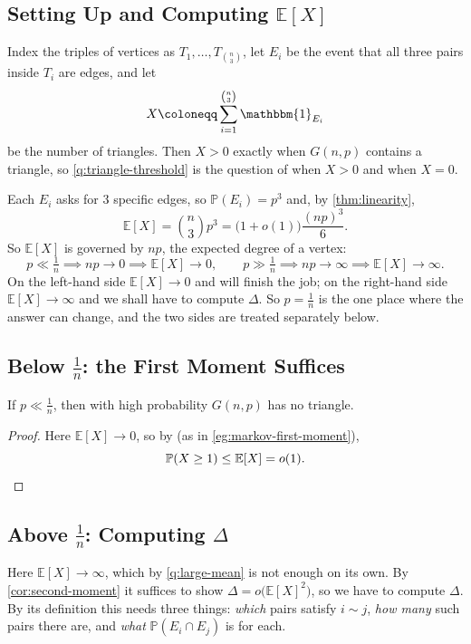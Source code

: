 \subsection{Setting Up and Computing \(\mathbb{E}[X]\)}

Index the triples of vertices as \(T_1, \ldots, T_{\binom{n}{3}}\), let \(E_i\) be the event that all three pairs inside \(T_i\) are edges, and let
\[
    X \coloneqq \sum_{i=1}^{\binom{n}{3}} \mathbbm{1}_{E_i}
\]
be the number of triangles. Then \(X > 0\) exactly when \(G(n,p)\) contains a triangle, so \autoref{q:triangle-threshold} is the question of when \(X > 0\) and when \(X = 0\).

Each \(E_i\) asks for \(3\) specific edges, so \(\mathbb{P}(E_i) = p^{3}\) and, by \autoref{thm:linearity},
\[
    \mathbb{E}[X] = \binom{n}{3} p^{3} = \bigl( 1 + o(1) \bigr) \frac{(np)^{3}}{6}.
\]
So \(\mathbb{E}[X]\) is governed by \(np\), the expected degree of a vertex:
\[
    p \ll \tfrac{1}{n} \implies np \to 0 \implies \mathbb{E}[X] \to 0,
    \qquad
    p \gg \tfrac{1}{n} \implies np \to \infty \implies \mathbb{E}[X] \to \infty.
\]
On the left-hand side \(\mathbb{E}[X] \to 0\) and  will finish the job; on the right-hand side \(\mathbb{E}[X] \to \infty\) and we shall have to compute \(\Delta\). So \(p = \frac{1}{n}\) is the one place where the answer can change, and the two sides are treated separately below.

\subsection{Below \(\frac{1}{n}\): the First Moment Suffices}

\begin{proposition}\label{prop:triangle-sparse}
    If \(p \ll \frac{1}{n}\), then with high probability \(G(n,p)\) has no triangle.
\end{proposition}

\begin{proof}
    Here \(\mathbb{E}[X] \to 0\), so by  (as in \autoref{eg:markov-first-moment}),
    \[
        \mathbb{P}(X \ge 1) \le \mathbb{E}[X] = o(1). \qedhere
    \]
\end{proof}

\subsection{Above \(\frac{1}{n}\): Computing \(\Delta\)}

Here \(\mathbb{E}[X] \to \infty\), which by \autoref{q:large-mean} is not enough on its own. By \autoref{cor:second-moment} it suffices to show \(\Delta = o\bigl( \mathbb{E}[X]^{2} \bigr)\), so we have to compute \(\Delta\). By its definition this needs three things: \emph{which} pairs satisfy \(i \sim j\), \emph{how many} such pairs there are, and \emph{what} \(\mathbb{P}(E_i \cap E_j)\) is for each.

